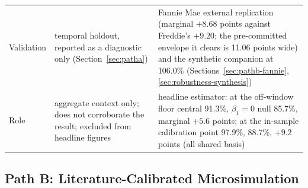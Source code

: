 \documentclass[12pt]{article}
\begin{document}
\begin{table}[H]
\begin{threeparttable}
\begin{tabular}{@{}p{2.2cm}p{5.9cm}p{5.9cm}@{}}
Validation & temporal holdout, reported as a diagnostic only (Section~\ref{sec:patha}) & Fannie Mae external replication (marginal $+8.68$ points against Freddie's $+9.20$; the pre-committed envelope it clears is 11.06 points wide) and the synthetic companion at 106.0\% (Sections~\ref{sec:pathb-fannie}, \ref{sec:robustness-synthesis}) \\
Role & aggregate context only; does not corroborate the result; excluded from headline figures & headline estimator: at the off-window floor central 91.3\%, $\beta_1 = 0$ null 85.7\%, marginal $+5.6$ points; at the in-sample calibration point 97.9\%, 88.7\%, $+9.2$ points (all shared basis) \\
\bottomrule
\end{tabular}
\end{threeparttable}
\end{table}

\subsection{Path B: Literature-Calibrated Microsimulation}\label{sec:pathb}
\end{document}
